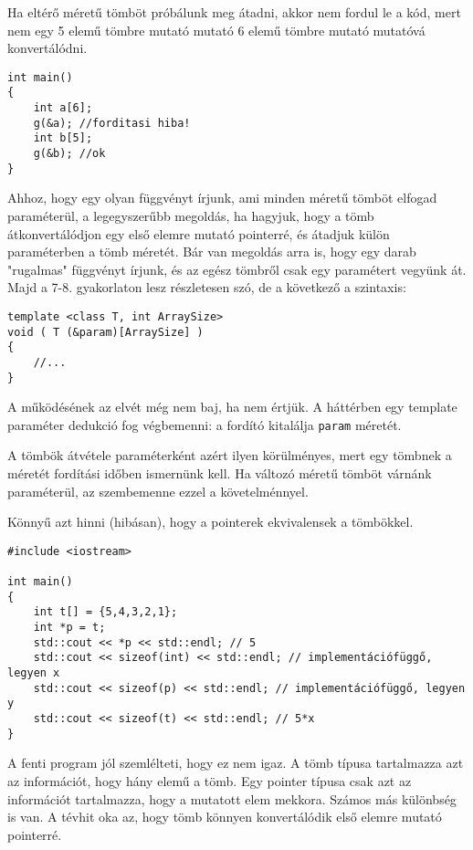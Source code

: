 \documentclass[../cpp_book/cpp_book.tex]{subfiles}
\begin{document}
	Ha eltérő méretű tömböt próbálunk meg átadni, akkor nem fordul le a kód, mert nem egy 5 elemű tömbre mutató mutató 6 elemű tömbre mutató mutatóvá konvertálódni.
	\begin{lstlisting}
int main()
{
	int a[6];
	g(&a); //forditasi hiba!
	int b[5];
	g(&b); //ok
}
	\end{lstlisting}
	\begin{note}
		Ahhoz, hogy egy olyan függvényt írjunk, ami minden méretű tömböt elfogad paraméterül, a legegyszerűbb megoldás, ha hagyjuk, hogy a tömb átkonvertálódjon egy első elemre mutató pointerré, és átadjuk külön paraméterben a tömb méretét. Bár van megoldás arra is, hogy egy darab "rugalmas" függvényt írjunk, és az egész tömbről csak egy paramétert vegyünk át. Majd a 7-8. gyakorlaton lesz részletesen szó, de a következő a szintaxis:
		\begin{lstlisting}
template <class T, int ArraySize>
void ( T (&param)[ArraySize] )
{
	//...
}
		\end{lstlisting}
		\smallskip
		A működésének az elvét még nem baj, ha nem értjük. A háttérben egy template paraméter dedukció fog végbemenni: a fordító kitalálja \texttt{param} méretét. 
		
		\smallskip
		A tömbök átvétele paraméterként azért ilyen körülményes, mert egy tömbnek a méretét fordítási időben ismernünk kell. Ha változó méretű tömböt várnánk paraméterül, az szembemenne ezzel a követelménnyel.  
	\end{note}
	Könnyű azt hinni (hibásan), hogy a pointerek ekvivalensek a tömbökkel.
	\begin{lstlisting}
#include <iostream>

int main()
{
	int t[] = {5,4,3,2,1};
	int *p = t;
	std::cout << *p << std::endl; // 5
	std::cout << sizeof(int) << std::endl; // implementációfüggő, legyen x
	std::cout << sizeof(p) << std::endl; // implementációfüggő, legyen y
	std::cout << sizeof(t) << std::endl; // 5*x
}
	\end{lstlisting} A fenti program jól szemlélteti, hogy ez nem igaz. A tömb típusa tartalmazza azt az információt, hogy hány elemű a tömb. Egy pointer típusa csak azt az információt tartalmazza, hogy a mutatott elem mekkora. Számos más különbség is van. A tévhit oka az, hogy tömb könnyen konvertálódik első elemre mutató pointerré.
\end{document}
